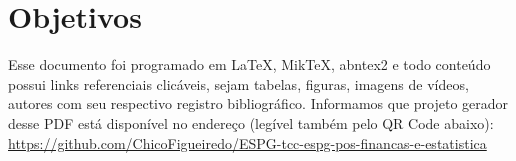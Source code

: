 \chapter{Objetivos}

Esse documento foi programado em \LaTeX, MikTeX, abntex2 e todo conteúdo possui links referenciais clicáveis, sejam tabelas, figuras, imagens de vídeos, autores com seu respectivo registro bibliográfico.
Informamos que projeto gerador desse PDF está disponível no endereço (legível também pelo QR Code abaixo): \\
\url{https://github.com/ChicoFigueiredo/ESPG-tcc-espg-pos-financas-e-estatistica} \\
\begin{center}
    \href{https://github.com/ChicoFigueiredo/ESPG-tcc-espg-pos-financas-e-estatistica}{
    }
\end{center}

